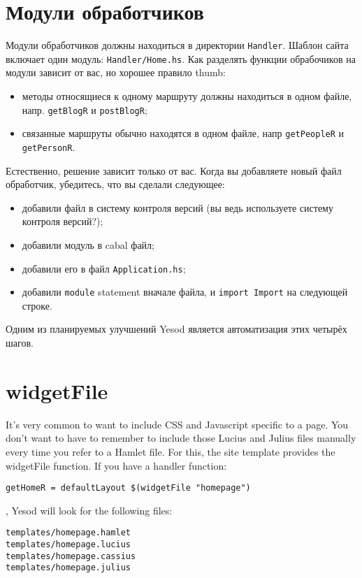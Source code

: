 \section{Модули обработчиков}

Модули обработчиков должны находиться в директории \texttt{Handler}. Шаблон сайта включает один
модуль: \texttt{Handler/Home.hs}. Как разделять функции обрабочиков на модули зависит от вас, но
хорошее правило thumb:
\begin{itemize}
    \item методы относящиеся к одному маршруту должны находиться в одном файле, напр. \lstinline!getBlogR!
          и \lstinline!postBlogR!;
    \item связанные маршруты обычно находятся в одном файле, напр \lstinline!getPeopleR! и \lstinline!getPersonR!.
\end{itemize}

Естественно, решение зависит только от вас. Когда вы добавляете новый файл обработчик, убедитесь,
что вы сделали следующее:
\begin{itemize}
  \item добавили файл в систему контроля версий (вы ведь используете систему контроля версий?);
  \item добавили модуль в cabal файл;
  \item добавили его в файл \texttt{Application.hs};
  \item добавили \lstinline!module! statement вначале файла, и \lstinline!import Import! на следующей строке.
\end{itemize}

Одним из планируемых улучшений Yesod является автоматизация этих четырёх шагов.

\section{widgetFile}

It's very common to want to include CSS and Javascript specific to a page. You don't want to have to remember to include those Lucius and Julius files manually every time you refer to a Hamlet file. For this, the site template provides the widgetFile function.
If you have a handler function:
\begin{lstlisting}
getHomeR = defaultLayout $(widgetFile "homepage")
\end{lstlisting}
, Yesod will look for the following files:
\begin{lstlisting}
templates/homepage.hamlet
templates/homepage.lucius
templates/homepage.cassius
templates/homepage.julius
\end{lstlisting}

